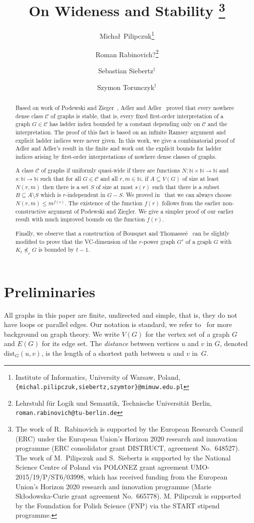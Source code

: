 \documentclass[11pt, fleqn]{article}
\title{On Wideness and Stability
\thanks{
The work of R.\ Rabinovich is supported by the
European Research Council (ERC) under the European Union's Horizon
2020 research and innovation programme (ERC consolidator grant DISTRUCT,
agreement No.\ 648527).
The work of M.\ Pilipczuk and S.\ Siebertz is supported by the National Science Centre of 
Poland via POLONEZ grant agreement UMO-2015/19/P/ST6/03998, 
which has received funding from the European Union's Horizon 2020 research and 
innovation programme (Marie Sk\l odowska-Curie grant agreement No.\ 665778).
M. Pilipczuk is supported by the Foundation for Polish Science (FNP) via the START stipend programme.
}}
\author{
Micha\l~Pilipczuk\thanks{Institute of Informatics, University of Warsaw, Poland, \texttt{\{michal.pilipczuk,siebertz,szymtor\}@mimuw.edu.pl}}
\and Roman Rabinovich?\thanks{Lehrstuhl f\"ur Logik und Semantik, Technische Universit\"at Berlin, \texttt{roman.rabinovich@tu-berlin.de}}
\and Sebastian Siebertz$^\dagger$
\and Szymon Torunczyk$^\dagger$}
\theoremstyle{plain}
\theoremstyle{nonumberplain}
\newcommand{\CCC}{\mathcal{C}}
\newcommand{\N}{\mathbb{N}}
\newcommand{\minor}{\preccurlyeq}
\newcommand{\dist}{\mathrm{dist}}
\begin{document}
\maketitle

\begin{abstract}
\noindent 
Based on work of Podewski and Zieger~\cite{podewski1978stable}, 
Adler and Adler~\cite{adler2014interpreting}
proved that every nowhere dense class $\CCC$ of graphs is stable, that is, 
every fixed first-order interpretation of a graph $G\in \CCC$ has 
ladder index bounded by a constant depending only on $\CCC$ and 
the interpretation. The proof of this fact is based on an infinite
Ramsey argument and explicit ladder indices were never given. 
In this work, we give a combinatorial proof of Adler and Adler's result in 
the finite and work out the explicit bounds for ladder indices arising
by first-order interpretations of nowhere dense classes of graphs. 


A class $\CCC$ of graphs if uniformly quasi-wide if there are functions 
$N:\N\times\N\rightarrow\N$ and $s:\N\rightarrow\N$ such 
that for all $G\in \CCC$ and all $r,m\in \N$, if $A\subseteq V(G)$
of size at least $N(r,m)$ then there is a set $S$ of size at most $s(r)$
such that there is a subset $B\subseteq A\setminus S$ which is
$r$-independent in $G-S$. We proved in~\cite{siebertz2016polynomial} 
that we can always choose $N(r,m)\leq m^{f(r)}$. The existence of the 
function $f(r)$ follows 
from the earlier non-constructive argument of Podewski and Ziegler. 
We give a simpler proof of our earlier result with much improved bounds 
on the function $f(r)$.

Finally, we observe that a construction of Bousquet and 
Thomasse\'e~\cite{BousquetT15} can be slightly modified to prove that 
the VC-dimension of the $r$-power graph $G^r$ of a graph $G$
with $K_t\not\minor_r G$ is bounded by $t-1$.
\end{abstract}

\section{Preliminaries}

All graphs in this paper are finite, undirected and simple, that is, 
they do not have loops or parallel edges. Our notation is standard,
we refer to~\cite{diestel2012graph} for more background on 
graph theory. 
We write $V(G)$ for the vertex set of a graph $G$ and
$E(G)$ for its edge set. 
The {\em{distance}} between vertices $u$ and $v$ in $G$, denoted $\dist_G(u,v)$, is the length of a shortest path between $u$ and $v$ in~$G$.
\end{document}
